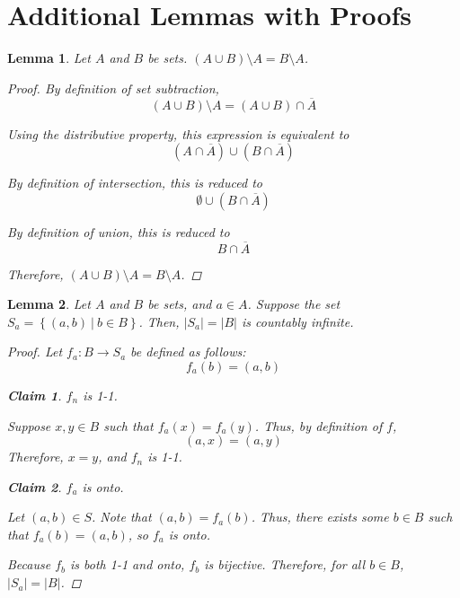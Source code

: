 \documentclass{article}
\newtheorem{lemma}{Lemma}
\newtheorem{lclaim}{Claim}[lemma]
\begin{document}
\section{Additional Lemmas with Proofs}

\begin{lemma}
    Let $A$ and $B$ be sets. $(A \cup B) \setminus A = B \setminus A$.
    \label{lem:aubsuba}

    \begin{proof}
        By definition of set subtraction,
        \begin{equation}
            (A \cup B) \setminus A = (A \cup B) \cap \overline{A}
        \end{equation}

        Using the distributive property, this expression is equivalent to
        \begin{equation}
            (A \cap \overline{A}) \cup (B \cap \overline{A})
        \end{equation}

        By definition of intersection, this is reduced to
        \begin{equation}
            \emptyset \cup (B \cap \overline{A})
        \end{equation}

        By definition of union, this is reduced to 
        \begin{equation}
            B \cap \overline{A}
        \end{equation}

        Therefore, $(A \cup B) \setminus A = B \setminus A$.
    \end{proof}
\end{lemma}

\begin{lemma}
    Let $A$ and $B$ be sets, and $a \in A$. Suppose the set $S_a = \left\{(a, b)\ |\ b \in B\right\}$. Then, $|S_a| = |B|$ is countably infinite.
    \label{lem:cart1}    
\begin{proof}
    Let $f_a: B \rightarrow S_a$ be defined as follows:
    $$f_a(b) = (a, b)$$

    \begin{lclaim}
        $f_n$ is 1-1.
    \end{lclaim}
    \begin{adjustwidth}{.5cm}{.5cm}
        Suppose $x, y \in B$ such that $f_a(x) = f_a(y)$. Thus, by definition of $f$,
        $$(a, x) = (a, y)$$
        Therefore, $x = y$, and $f_n$ is 1-1.
    \end{adjustwidth}
    \begin{lclaim}
        $f_a$ is onto.
    \end{lclaim}
    \begin{adjustwidth}{.5cm}{.5cm}
        Let $(a, b) \in S$. Note that $(a, b) = f_a(b)$. Thus, there exists some $b \in B$ such that $f_a(b) = (a, b)$, so $f_a$ is onto.
    \end{adjustwidth}

    Because $f_b$ is both 1-1 and onto, $f_b$ is bijective. Therefore, for all $b \in B$, $|S_a| = |B|$.
\end{proof}
\end{lemma}
\end{document}
